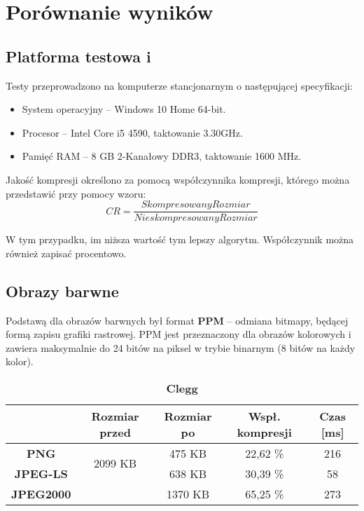 \section{Porównanie wyników}

\subsection{Platforma testowa i}

Testy przeprowadzono na komputerze stancjonarnym o następującej specyfikacji:

\begin{itemize}
	\item System operacyjny -- Windows 10 Home 64-bit.
	\item Procesor -- Intel Core i5 4590, taktowanie 3.30GHz.
	\item Pamięć RAM -- 8 GB 2-Kanałowy DDR3, taktowanie 1600 MHz.
\end{itemize}

Jakość kompresji określono za pomocą współczynnika kompresji, którego można przedstawić przy pomocy wzoru:
\[
CR = \frac{ Skompresowany Rozmiar }{ Nieskompresowany Rozmiar } 
\]

W tym przypadku, im niższa wartość tym lepszy algorytm. Współczynnik można również zapisać procentowo.

\subsection{Obrazy barwne}

Podstawą dla obrazów barwnych był format \textbf{PPM} -- odmiana bitmapy, będącej formą zapisu grafiki rastrowej. PPM jest przeznaczony dla obrazów kolorowych i zawiera maksymalnie do 24 bitów na piksel w trybie binarnym (8 bitów na każdy kolor).

\begin{table}[!h]
	\centering
	\caption{\textbf{Clegg}}
	\label{my-label}
	\begin{tabular}{|c|c|c|c|c|}                                             
		\hline
		& \textbf{Rozmiar przed} & \textbf{Rozmiar po} & \textbf{Wspł. kompresji} & \textbf{Czas {[}ms{]}} \\ \hline 
		\textbf{PNG}      &          \multicolumn{1}{c|}{\multirow{2}{*}{2099 KB}}             &      475 KB               &         22,62 \%                 &              216               \\\cline{3-5}
		\textbf{JPEG-LS}  &                        &        638  KB         &      30,39 \%                  &         58                 \\\cline{3-5}
		\textbf{JPEG2000} &                        &        1370 KB             &       65,25 \%                   &        273              \\ \hline
	\end{tabular}
\end{table}

